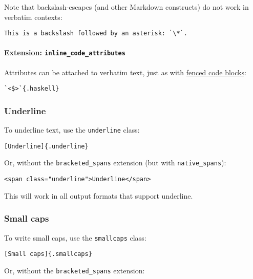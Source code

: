 \documentclass[
]{article}
\begin{document}
Note that backslash-escapes (and other Markdown constructs) do not work
in verbatim contexts:

\begin{verbatim}
This is a backslash followed by an asterisk: `\*`.
\end{verbatim}

\hypertarget{extension-inline_code_attributes}{%
\paragraph{\texorpdfstring{Extension:
\texttt{inline\_code\_attributes}}{Extension: inline\_code\_attributes}}\label{extension-inline_code_attributes}}

Attributes can be attached to verbatim text, just as with
\protect\hyperlink{fenced-code-blocks}{fenced code blocks}:

\begin{verbatim}
`<$>`{.haskell}
\end{verbatim}

\hypertarget{underline}{%
\subsubsection{Underline}\label{underline}}

To underline text, use the \texttt{underline} class:

\begin{verbatim}
[Underline]{.underline}
\end{verbatim}

Or, without the \texttt{bracketed\_spans} extension (but with
\texttt{native\_spans}):

\begin{verbatim}
<span class="underline">Underline</span>
\end{verbatim}

This will work in all output formats that support underline.

\hypertarget{small-caps}{%
\subsubsection{Small caps}\label{small-caps}}

To write small caps, use the \texttt{smallcaps} class:

\begin{verbatim}
[Small caps]{.smallcaps}
\end{verbatim}

Or, without the \texttt{bracketed\_spans} extension:
\end{document}
